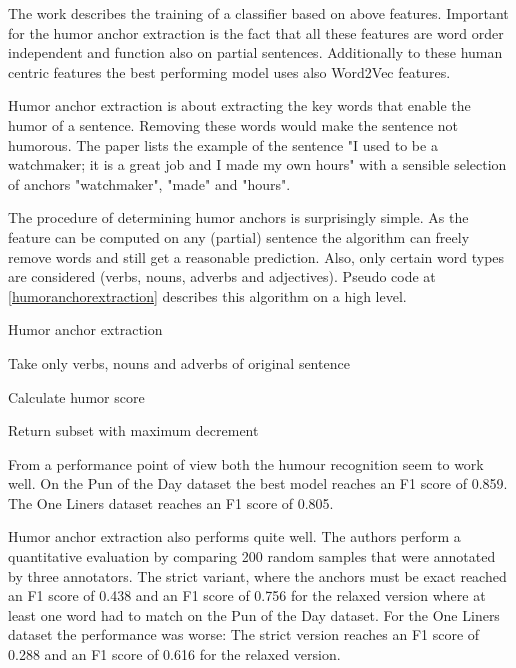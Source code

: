 \documentclass[draft,final,oneside]{vutinfth} %
\begin{document}
The work describes the training of a classifier based on above features. Important for the humor anchor extraction is the fact that all these features are word order independent and function also on partial sentences. Additionally to these human centric features the best performing model uses also Word2Vec features.

Humor anchor extraction is about extracting the key words that enable the humor of a sentence. Removing these words would make the sentence not humorous. The paper lists the example of the sentence "I used to be a watchmaker; it is a great job and I made my own hours" with a sensible selection of anchors "watchmaker", "made" and "hours".

The procedure of determining humor anchors is surprisingly simple. As the feature can be computed on any (partial) sentence the algorithm can freely remove words and still get a reasonable prediction. Also, only certain word types are considered (verbs, nouns, adverbs and adjectives). Pseudo code at \ref{humoranchorextraction} describes this algorithm on a high level.

\begin{algorithm}
\caption{Humor anchor extraction}\label{humoranchorextraction}

Take only verbs, nouns and adverbs of original sentence

Calculate humor score


Return subset with maximum decrement

\end{algorithm}

From a performance point of view both the humour recognition seem to work well. On the Pun of the Day dataset the best model reaches an F1 score of 0.859. The One Liners dataset reaches an F1 score of 0.805.

Humor anchor extraction also performs quite well. The authors perform a quantitative evaluation by comparing 200 random samples that were annotated by three annotators. The strict variant, where the anchors must be exact reached an F1 score of 0.438 and an F1 score of 0.756 for the relaxed version where at least one word had to match on the Pun of the Day dataset. For the One Liners dataset the performance was worse: The strict version reaches an F1 score of 0.288 and an F1 score of 0.616 for the relaxed version.
\end{document}
